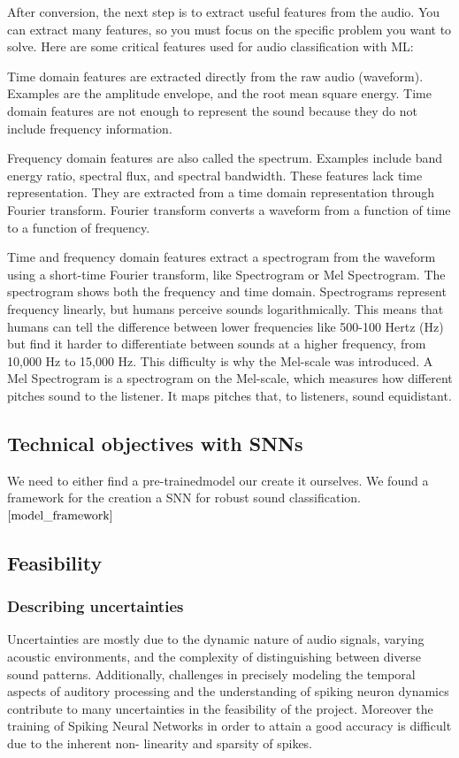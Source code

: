 \documentclass[11pt]{article}
\begin{document}
  After conversion, the next step is to extract useful features from the audio. You can extract many features, so you must focus on the specific problem you want to solve. Here are some critical features used for audio classification with ML:

  Time domain features are extracted directly from the raw audio (waveform). Examples are the amplitude envelope, and the root mean square energy. Time domain features are not enough to represent the sound because they do not include frequency information.

  Frequency domain features are also called the spectrum. Examples include band energy ratio, spectral flux, and spectral bandwidth. These features lack time representation. They are extracted from a time domain representation through Fourier transform. Fourier transform converts a waveform from a function of time to a function of frequency.

  Time and frequency domain features extract a spectrogram from the waveform using a short-time Fourier transform, like Spectrogram or Mel Spectrogram. The spectrogram shows both the frequency and time domain. Spectrograms represent frequency linearly, but humans perceive sounds logarithmically. This means that humans can tell the difference between lower frequencies like 500-100 Hertz (Hz) but find it harder to differentiate between sounds at a higher frequency, from 10,000 Hz to 15,000 Hz. This difficulty is why the Mel-scale was introduced. A Mel Spectrogram is a spectrogram on the Mel-scale, which measures how different pitches sound to the listener. It maps pitches that, to listeners, sound equidistant.


\subsection{Technical objectives with SNNs}

We need to either find a pre-trainedmodel our create it ourselves. We found a framework for the creation a SNN for robust sound classification.${\cite{model_framework}}$


\subsection{Feasibility}
\subsubsection{Describing uncertainties}
Uncertainties are mostly due to the dynamic nature of audio signals, varying acoustic environments, and the complexity of distinguishing between diverse sound patterns. Additionally, challenges in precisely modeling the temporal aspects of auditory processing and the understanding of spiking neuron dynamics contribute to many uncertainties in the feasibility of the project. Moreover the training of Spiking Neural Networks in order to attain a good accuracy is difficult due to the inherent non- linearity and sparsity of spikes.
\end{document}
